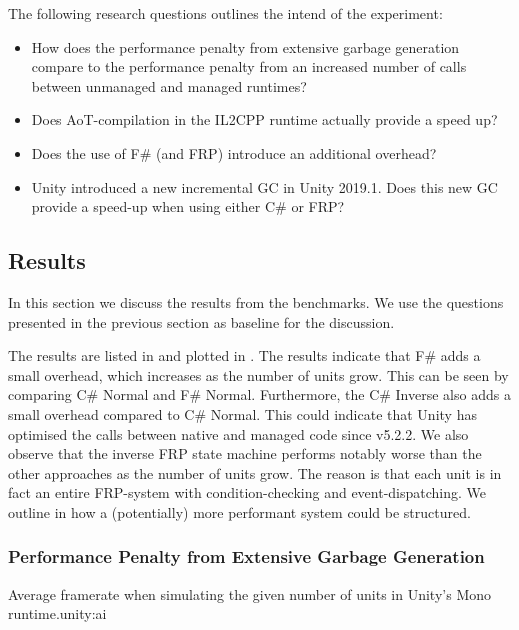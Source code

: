 The following research questions outlines the intend of the experiment:
\begin{itemize}
    \item How does the performance penalty from extensive garbage generation compare to the performance penalty from an increased number of calls between unmanaged and managed runtimes?
    \item Does \gls{AoT}-compilation in the IL2CPP runtime actually provide a speed up?
    \item Does the use of F\# (and \gls{FRP}) introduce an additional overhead?
    \item Unity introduced a new incremental \gls{GC} in Unity 2019.1. Does this new \gls{GC} provide a speed-up when using either C\# or \gls{FRP}?
\end{itemize}

\subsection{Results}\label{sec:unity-garbage-res}
In this section we discuss the results from the benchmarks. We use the questions presented in the previous section as baseline for the discussion.

The results are listed in  and plotted in . The results indicate that F\# adds a small overhead, which increases as the number of units grow. This can be seen by comparing C\# Normal and F\# Normal. Furthermore, the C\# Inverse also adds a small overhead compared to C\# Normal. This could indicate that Unity has optimised the calls between native and managed code since v5.2.2. We also observe that the inverse \gls{FRP} state machine performs notably worse than the other approaches as the number of units grow. The reason is that each unit is in fact an entire \gls{FRP}-system with condition-checking and event-dispatching. We outline in  how a (potentially) more performant system could be structured.
\subsubsection{Performance Penalty from Extensive Garbage Generation}

%
{Average framerate when simulating the given number of units in Unity's Mono runtime.}{unity:ai}%

